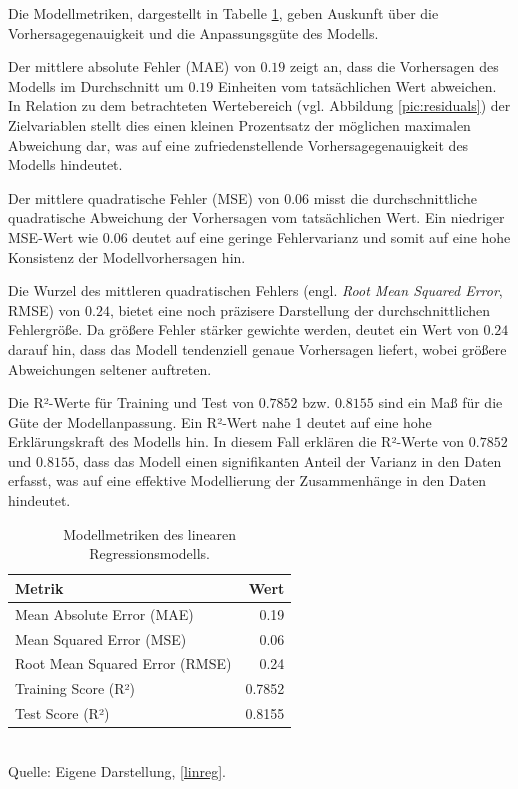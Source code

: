 Die Modellmetriken, dargestellt in Tabelle \ref{tab:model-metrics}, 
geben Auskunft über die Vorhersagegenauigkeit und die Anpassungsgüte des Modells. 

Der mittlere absolute Fehler (MAE) von $0.19$ zeigt an, dass die Vorhersagen des Modells im Durchschnitt um $0.19$ 
Einheiten vom tatsächlichen Wert abweichen. In Relation zu dem betrachteten Wertebereich (vgl. Abbildung \ref{pic:residuals}) der Zielvariablen stellt dies einen kleinen Prozentsatz 
der möglichen maximalen Abweichung dar, was auf eine zufriedenstellende Vorhersagegenauigkeit des Modells hindeutet.

Der mittlere quadratische Fehler (MSE) von $0.06$ misst die durchschnittliche quadratische Abweichung der Vorhersagen 
vom tatsächlichen Wert. Ein niedriger MSE-Wert wie $0.06$ deutet auf eine geringe Fehlervarianz und somit auf eine 
hohe Konsistenz der Modellvorhersagen hin.

Die Wurzel des mittleren quadratischen Fehlers (engl. \textit{Root Mean Squared Error}, RMSE) von $0.24$, bietet eine noch präzisere Darstellung 
der durchschnittlichen Fehlergröße. Da größere Fehler stärker gewichte werden, deutet ein Wert von $0.24$ darauf hin, 
dass das Modell tendenziell genaue Vorhersagen liefert, wobei größere Abweichungen seltener auftreten.

Die R²-Werte für Training und Test von $0.7852$ bzw. $0.8155$ sind ein Maß für die Güte der Modellanpassung. 
Ein R²-Wert nahe 1 deutet auf eine hohe Erklärungskraft des Modells hin. In diesem Fall erklären die R²-Werte von $0.7852$ und $0.8155$, 
dass das Modell einen signifikanten Anteil der Varianz in den Daten erfasst, 
was auf eine effektive Modellierung der Zusammenhänge in den Daten hindeutet.

\begin{table}[!h]
    \caption{Modellmetriken des linearen Regressionsmodells.}
    \begin{tabularx}{\textwidth}{Xr}
    \toprule
    Metrik & Wert \\
    \midrule
    Mean Absolute Error (MAE) & 0.19 \\
    Mean Squared Error (MSE) & 0.06 \\
    Root Mean Squared Error (RMSE) & 0.24 \\
    Training Score (R²) & 0.7852 \\
    Test Score (R²) & 0.8155 \\
    \bottomrule
    \end{tabularx}
    \label{tab:model-metrics}
    \\ Quelle: Eigene Darstellung, \ref{linreg}.
\end{table}

